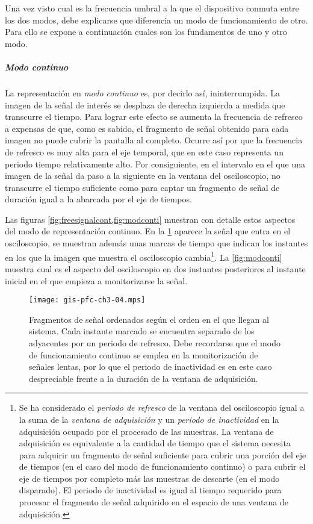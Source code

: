 Una vez visto cual es la frecuencia umbral a la que el dispositivo conmuta
entre los dos modos, debe explicarse que diferencia un modo de
funcionamiento de otro. Para ello se expone a continuación cuales son los
fundamentos de uno y otro modo.


\subparagraph{Modo continuo}

La representación en \emph{modo continuo} es, por decirlo así,
ininterrumpida. La imagen de la señal de interés se desplaza de derecha
izquierda a medida que transcurre el tiempo. Para lograr este efecto se
aumenta la frecuencia de refresco a expensas de que, como es sabido, el
fragmento de señal obtenido para cada imagen no puede cubrir la pantalla al
completo. Ocurre así por que la frecuencia de refresco es muy alta para el
eje temporal, que en este caso representa un periodo tiempo relativamente
alto. Por consiguiente, en el intervalo en el que una imagen de la señal da
paso a la siguiente en la ventana del osciloscopio, no transcurre el tiempo
suficiente como para captar un fragmento de señal de duración igual a la
abarcada por el eje de tiempos.

Las figuras \cref{fig:freesignalcont,fig:modconti} muestran con detalle
estos aspectos del modo de representación continuo. En la
\cref{fig:freesignalcont} aparece la señal que entra en el osciloscopio, se
muestran además unas marcas de tiempo que indican los instantes en los que
la imagen que muestra el osciloscopio cambia\footnote{Se ha considerado el
\emph{periodo de refresco} de la ventana del osciloscopio igual a la suma
de la \emph{ventana de adquisición} y un \emph{periodo de inactividad} en
la adquisición ocupado por el procesado de las muestras. La ventana de
adquisición es equivalente a la cantidad de tiempo que el sistema necesita
para adquirir un fragmento de señal suficiente para cubrir una porción del
eje de tiempos (en el caso del modo de funcionamiento continuo) o para
cubrir el eje de tiempos por completo más las muestras de descarte (en el
modo disparado). El periodo de inactividad es igual al tiempo requerido
para procesar el fragmento de señal adquirido en el espacio de una ventana
de adquisición.}. La \cref{fig:modconti} muestra cual es el aspecto del
osciloscopio en dos instantes posteriores al instante inicial en el que
empieza a monitorizarse la señal.

\begin{figure}
	\begin{center}
		\texttt{[image: gis-pfc-ch3-04.mps]}
	\end{center}
	\caption[Fragmentos de señal ordenados según el orden en el que
	llegan al sistema]{Fragmentos de señal ordenados según el orden en
	el que llegan al sistema. Cada instante marcado se encuentra
	separado de los adyacentes por un periodo de refresco. Debe
	recordarse que el modo de funcionamiento continuo se emplea en la
	monitorización de señales lentas, por lo que el periodo de
	inactividad es en este caso despreciable frente a la duración de la
	ventana de adquisición.}
	\label{fig:freesignalcont}
\end{figure}

